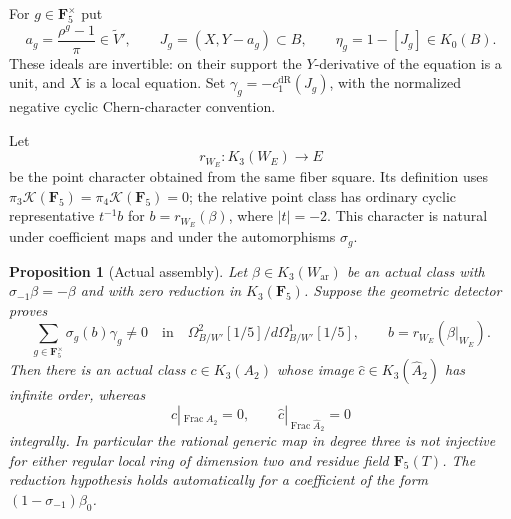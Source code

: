 \documentclass[11pt,a4paper]{article}
\newtheorem{proposition}[theorem]{Proposition}
\theoremstyle{remark}
\begin{document}
For $g\in\mathbf F_5^\times$ put
\[
 a_g=\frac{\rho^g-1}{\pi}\in\widetilde V',\qquad
 J_g=(X,Y-a_g)\subset B,\qquad
 \eta_g=1-[J_g]\in K_0(B).
\]
These ideals are invertible: on their support the $Y$-derivative
of the equation is a unit, and $X$ is a local equation.
Set $\gamma_g=-c_1^{\mathrm{dR}}(J_g)$, with the normalized
negative cyclic Chern-character convention.

Let
\[
 r_{W_E}:K_3(W_E)\longrightarrow E
\]
be the point character obtained from the same fiber square.
Its definition uses
$\pi_3\mathcal K(\mathbf F_5)=
 \pi_4\mathcal K(\mathbf F_5)=0$; the relative point class has
ordinary cyclic representative $t^{-1}b$ for $b=r_{W_E}(\beta)$,
where $|t|=-2$. This character is natural under coefficient maps
and under the automorphisms $\sigma_g$.

\begin{proposition}[Actual assembly]
\label{prop:dimensiontwoactualassembly}
Let $\beta\in K_3(W_{\mathrm{ar}})$ be an actual class with
$\sigma_{-1}\beta=-\beta$ and with zero reduction in
$K_3(\mathbf F_5)$. Suppose the geometric detector proves
\begin{equation}
 \sum_{g\in\mathbf F_5^\times}\sigma_g(b)\gamma_g\ne0
 \quad\text{in}\quad
 \Omega^2_{B/W'}[1/5]/d\Omega^1_{B/W'}[1/5],
 \qquad b=r_{W_E}(\beta|_{W_E}).
\label{eq:dimensiontwodetectedcoefficient}
\end{equation}
Then there is an actual class $c\in K_3(A_2)$ whose image
$\widehat c\in K_3(\widehat A_2)$ has infinite order, whereas
\[
 c|_{\operatorname{Frac}A_2}=0,\qquad
 \widehat c|_{\operatorname{Frac}\widehat A_2}=0
\]
integrally. In particular the rational generic map in degree
three is not injective for either regular local ring of
dimension two and residue field $\mathbf F_5(T)$.
The reduction hypothesis holds automatically for a coefficient
of the form $(1-\sigma_{-1})\beta_0$.
\end{proposition}
\end{document}
